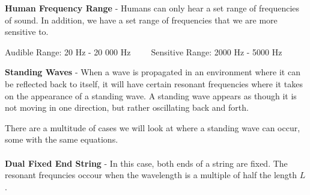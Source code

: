 \documentclass{article}
\begin{document}
\noindent\textbf{Human Frequency Range} - Humans can only hear a set range of frequencies of sound. In addition, we have a set range of frequencies that we are more sensitive to.\\
\vspace{-10pt}
\begin{center}
	Audible Range: 20 Hz - 20 000 Hz $\:\:\:\:\:\:\:\:$ Sensitive Range: 2000 Hz - 5000 Hz
\end{center}
\vspace{\baselineskip}
\textbf{Standing Waves} - When a wave is propagated in an environment where it can be reflected back to itself, it will have certain resonant frequencies where it takes on the appearance of a standing wave. A standing wave appears as though it is not moving in one direction, but rather oscillating back and forth.
\begin{center}

	\hspace*{-8pt} 
\end{center}
There are a multitude of cases we will look at where a standing wave can occur, some with the same equations.\\
\\
\textbf{Dual Fixed End String} - In this case, both ends of a string are fixed. The resonant frequncies occour when the wavelength is a multiple of half the length $L$.
\end{document}
